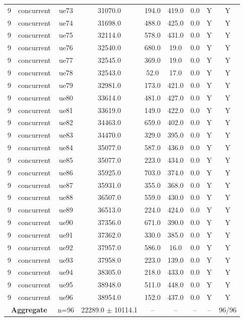 \begin{table}[ht]
\begin{tabular}{|c|c|c|c|c|c|c|c|c|}
9 & concurrent & ue73 & 31070.0 & 194.0 & 419.0 & 0.0 & Y & Y \\
9 & concurrent & ue74 & 31698.0 & 488.0 & 425.0 & 0.0 & Y & Y \\
9 & concurrent & ue75 & 32114.0 & 578.0 & 431.0 & 0.0 & Y & Y \\
9 & concurrent & ue76 & 32540.0 & 680.0 & 19.0 & 0.0 & Y & Y \\
9 & concurrent & ue77 & 32545.0 & 369.0 & 19.0 & 0.0 & Y & Y \\
9 & concurrent & ue78 & 32543.0 & 52.0 & 17.0 & 0.0 & Y & Y \\
9 & concurrent & ue79 & 32981.0 & 173.0 & 421.0 & 0.0 & Y & Y \\
9 & concurrent & ue80 & 33614.0 & 481.0 & 427.0 & 0.0 & Y & Y \\
9 & concurrent & ue81 & 33619.0 & 149.0 & 422.0 & 0.0 & Y & Y \\
9 & concurrent & ue82 & 34463.0 & 659.0 & 402.0 & 0.0 & Y & Y \\
9 & concurrent & ue83 & 34470.0 & 329.0 & 395.0 & 0.0 & Y & Y \\
9 & concurrent & ue84 & 35077.0 & 587.0 & 436.0 & 0.0 & Y & Y \\
9 & concurrent & ue85 & 35077.0 & 223.0 & 434.0 & 0.0 & Y & Y \\
9 & concurrent & ue86 & 35925.0 & 703.0 & 374.0 & 0.0 & Y & Y \\
9 & concurrent & ue87 & 35931.0 & 355.0 & 368.0 & 0.0 & Y & Y \\
9 & concurrent & ue88 & 36507.0 & 559.0 & 430.0 & 0.0 & Y & Y \\
9 & concurrent & ue89 & 36513.0 & 224.0 & 424.0 & 0.0 & Y & Y \\
9 & concurrent & ue90 & 37356.0 & 671.0 & 390.0 & 0.0 & Y & Y \\
9 & concurrent & ue91 & 37362.0 & 330.0 & 385.0 & 0.0 & Y & Y \\
9 & concurrent & ue92 & 37957.0 & 586.0 & 16.0 & 0.0 & Y & Y \\
9 & concurrent & ue93 & 37958.0 & 223.0 & 139.0 & 0.0 & Y & Y \\
9 & concurrent & ue94 & 38305.0 & 218.0 & 433.0 & 0.0 & Y & Y \\
9 & concurrent & ue95 & 38948.0 & 511.0 & 448.0 & 0.0 & Y & Y \\
9 & concurrent & ue96 & 38954.0 & 152.0 & 437.0 & 0.0 & Y & Y \\
\multicolumn{2}{|c|}{\textbf{Aggregate}} & n=96 & 22289.0 $\pm$ 10114.1 & -- & -- & -- & -- & 96/96 \\

\end{tabular}
\end{table}
